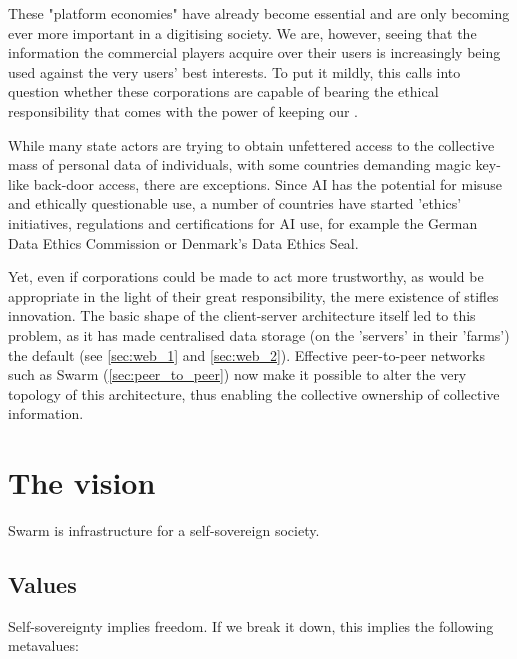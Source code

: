 These "platform economies" have already become essential and are only becoming ever more important in a digitising society. We are, however, seeing that the information the commercial players acquire over their users is increasingly being used against the very users' best interests. To put it mildly, this calls into question whether these corporations are capable of bearing the ethical responsibility that comes with the power of keeping our .

While many state actors are trying to obtain unfettered access to the collective mass of personal data of individuals, with some countries demanding magic key-like back-door access, there are exceptions. Since AI has the potential for misuse and ethically questionable use, a number of countries have started 'ethics' initiatives, regulations and certifications for AI use, for example the German Data Ethics Commission or Denmark's Data Ethics Seal. 

Yet, even if corporations could be made to act more trustworthy, as would be appropriate in the light of their great responsibility, the mere existence of  stifles innovation. The basic shape of the client-server architecture itself  led to this problem, as it has made centralised data storage (on the 'servers' in their 'farms') the default (see \ref{sec:web_1} and \ref{sec:web_2}). Effective peer-to-peer networks such as Swarm (\ref{sec:peer_to_peer}) now make it possible to alter the very topology of this architecture, thus enabling the collective ownership of collective information. 


\section{The vision  \statusorange}\label{sec:vision}


\begin{displayquote}
Swarm is infrastructure for a self-sovereign society. 
\end{displayquote}


\subsection{Values \statusorange}\label{sec:values}

Self-sovereignty implies freedom. If we break it down, this implies the following metavalues: 

